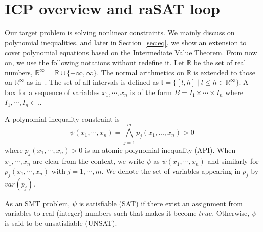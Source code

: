 \documentclass[runningheads,a4paper,oribibl]{llncs}
\begin{document}

\section{ICP overview and \textbf{raSAT} loop}
\label{sec:raSATloop} 

\sloppy

Our target problem is solving nonlinear constraints.
We mainly discuss on polynomial inequalities, and later in Section~\ref{sec:eq},
we show an extension to cover polynomial equations based on the
Intermediate Value Theorem. From now on, we use the following notations without redefine it. Let $\mathbb{R}$ be the set of real numbers, $\mathbb{R}^\infty = \mathbb{R} \cup \{-\infty, \infty \}$. The normal arithmetics on $\mathbb{R}$ is extended to those on $\mathbb{R}^\infty$ as in~\cite{moore}. The set of all intervals is defined as $\mathbb{I} = \{[l, h] \mid l \le h \in \mathbb{R}^\infty \}$. A box for a sequence of variables $x_1, \cdots, x_n$ is of the form $B = I_1 \times \cdots \times I_n$ where $I_1, \cdots, I_n \in \mathbb{I}$.

\begin{definition}
A polynomial inequality constraint is
\[\psi(x_1,\cdots,x_n) = \bigwedge
\limits_{j=1}^m p_j(x_1,...,x_n) > 0\]
where $p_j(x_1,\cdots,x_n) > 0$ is an atomic polynomial inequality (API). When $x_1, \cdots, x_n$ are clear from the context, we write $\psi$ as $\psi(x_1, \cdots, x_n)$ and similarly for $p_j(x_1, \cdots, x_n)$ with $j = 1, \cdots, m$.
We denote the set of variables appearing in $p_j$ by $var(p_j)$. 
\end{definition}
As an SMT problem, $\psi$ is satisfiable (SAT) if there exist an assignment from variables to real (integer) numbers such that makes it become $true$. Otherwise, $\psi$ is said to be unsatisfiable (UNSAT).
\end{document}

